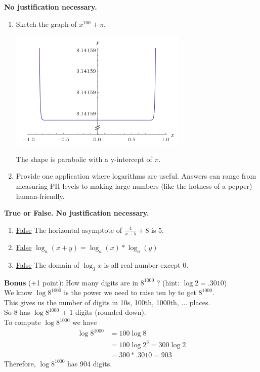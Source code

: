 \documentclass[a4paper, 12pt]{article}
\newcommand{\bt}[1]{\textbf{#1}} %
\newcommand{\eq}[1]{\begin{align*}#1\end{align*}} %
\renewcommand{\eq}[1]{\begin{align*}#1\end{align*}} %
\newcommand{\green}[1]{\textcolor{javagreen}{#1}} %
\begin{document}
\bt{No justification necessary.}
\begin{enumerate}[resume]
    \item Sketch the graph of $x^{100} + \pi$.

    \includegraphics{graphs/x_100_pi.png}

\green{    The shape is parabolic with a y-intercept of $\pi$.}
    \item Provide one application where logarithms are useful.
    \green{
    Answers can range from measuring PH levels to making large numbers (like the hotness of a pepper) human-friendly.
    }
\end{enumerate}

\bt{True or False. No justification necessary.}
\begin{enumerate}[resume]
    \item \underline{\green{False}} The horizontal asymptote of $\frac{4}{x-5} + 8$ is 5.
    \item \underline{\green{False}} $\log_a (x + y) = \log_a (x) * \log_a (y)$
    \item \underline{\green{False}} The domain of $\log_3 x$  is all real number except 0. \\
\end{enumerate}

\bt{Bonus} (+1 point): How many digits are in $8^{1000}$ ? (hint: $\log 2 = .3010$) \\

\green{
We know $\log 8^{1000}$ is the power we need to raise ten by to get $8^{1000}$. \\
This gives us the number of digits in 10s, 100th, 1000th, $\dots$ places. \\
So 
$8$ has $\log 8^{1000}$ + 1 digits (rounded down). \\
To compute $\log 8^{1000}$ we have
\eq{
\log 8^{1000} &= 100 \log 8 \\
&= 100 \log 2^3 = 300 \log 2  \\
& = 300 * .3010 = 903
}
Therefore, $\log 8^{1000}$ has 904 digits.
}
\end{document}
